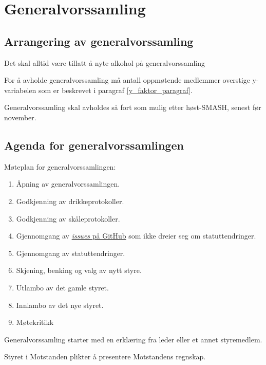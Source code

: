   
\section{Generalvorssamling}
    \subsection{Arrangering av generalvorssamling}
        \begin{statute}
            Det skal alltid være tillatt å nyte alkohol på generalvorssamling
        \end{statute}
        \begin{statute} 
            For å avholde generalvorssamling må antall oppmøtende medlemmer overstige y-variabelen som er beskrevet i paragraf \ref{y_faktor_paragraf}.
        \end{statute}
        \begin{statute}
            Generalvorssamling skal avholdes så fort som mulig etter høst-SMASH, senest før november.
        \end{statute}
    
    \subsection{Agenda for generalvorssamlingen}
        \begin{statute}
            Møteplan for generalvorssamlingen:
            \begin{enumerate}
                \item Åpning av generalvorssamlingen.
                \item Godkjenning av drikkeprotokoller.
                \item Godkjenning av skåleprotokoller.
                \item Gjennomgang av \href{https://github.com/Motstanden/motstanden-statutter/issues}{\textit{issues} på GitHub} som ikke dreier seg om statuttendringer.
                \item Gjennomgang av statuttendringer.
                \item Skjening, benking og valg av nytt styre.
                \item Utlambo av det gamle styret.
                \item Innlambo av det nye styret.
                \item Møtekritikk
            \end{enumerate}
        \end{statute}
        \begin{statute}
            Generalvorssamling starter med en erklæring fra leder eller et annet styremedlem.
        \end{statute}
        \begin{statute}
            Styret i Motstanden plikter å presentere Motstandens regnskap. 
        \end{statute}


